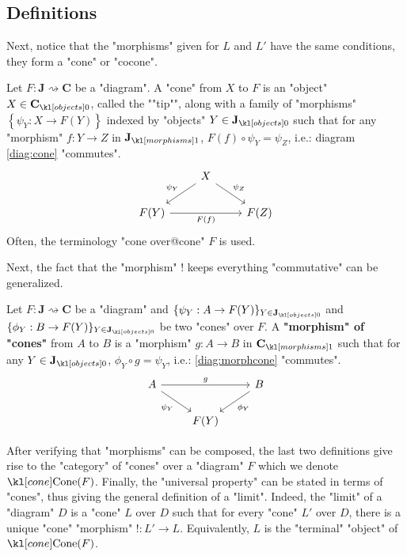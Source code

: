 \documentclass[main.tex]{subfiles}
\begin{document}
\subsection{Definitions}
Next, notice that the "morphisms" given for $L$ and $L'$ have the same conditions, they form a "cone" or "cocone".
\begin{defn}[Cone]
    Let $F: \mathbf{J}\rightsquigarrow \mathbf{C}$ be a "diagram". \AP A "cone" from $X$ to $F$ is an "object" $X \in \obj{\mathbf{C}}$, called the ""tip"", along with a family of "morphisms" $\left\{ \psi_Y: X \rightarrow F(Y)\right\}$ indexed by "objects" $Y \in \obj{\mathbf{J}}$ such that for any "morphism" $f:Y \rightarrow Z$ in $\mor{\mathbf{J}}$, $F(f) \circ \psi_Y = \psi_Z$, i.e.: diagram \eqref{diag:cone} "commutes".
    \begin{equation}\label{diag:cone}
        \begin{tikzcd}
            & X \arrow[ld, "\psi_Y"'] \arrow[rd, "\psi_Z"] &\\
            F(Y)\arrow[rr, "F(f)"'] & & F(Z)
        \end{tikzcd}
    \end{equation}
    Often, the terminology "cone over@cone" $F$ is used.
\end{defn}
Next, the fact that the "morphism" $!$ keeps everything "commutative" can be generalized.
\begin{defn}
    Let $F:\mathbf{J}\rightsquigarrow \mathbf{C}$ be a "diagram" and $\{\psi_Y: A \rightarrow F(Y)\}_{Y \in \obj{\mathbf{J}}}$ and $\{\phi_Y: B\rightarrow F(Y)\}_{Y \in \obj{\mathbf{J}}}$ be two "cones" over $F$. A \textbf{"morphism" of "cones"} from $A$ to $B$ is a "morphism" $g:A\rightarrow B$ in $\mor{\mathbf{C}}$ such that for any $Y\in \obj{\mathbf{J}}$, $\phi_Y \circ g = \psi_Y$, i.e.: \eqref{diag:morphcone} "commutes".
    \begin{equation}\label{diag:morphcone}
        \begin{tikzcd}
            A \arrow[rr, "g"] \arrow[rd, "\psi_Y"'] &  & B \arrow[ld, "\phi_Y"] \\
             & F(Y) & 
        \end{tikzcd}
    \end{equation}
\end{defn}
After verifying that "morphisms" can be composed, the last two definitions give rise to the "category" of "cones" over a "diagram" $F$ which we denote $\cone(F)$. Finally, the "universal property" can be stated in terms of "cones", thus giving the general definition of a "limit". Indeed, the "limit" of a "diagram" $D$ is a "cone" $L$ over $D$ such that for every "cone" $L'$ over $D$, there is a unique "cone" "morphism" $!:L'\rightarrow L$. Equivalently, $L$ is the "terminal" "object" of $\cone(F)$.
\end{document}
